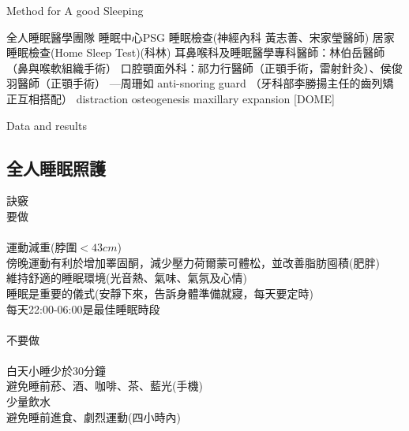 \documentclass[aspectratio=169]{beamer}
\begin{document}
\begin{frame}{Method for A good Sleeping}
\begin{block}{全人睡眠醫學團隊}
睡眠中心PSG 睡眠檢查(神經內科 黃志善、宋家瑩醫師)
居家睡眠檢查(Home Sleep Test)(科林)
耳鼻喉科及睡眠醫學專科醫師：林伯岳醫師（鼻與喉軟組織手術）
口腔顎面外科：祁力行醫師（正顎手術，雷射針灸）、侯俊羽醫師（正顎手術）
—周珊如 anti-snoring guard
（牙科部李勝揚主任的齒列矯正互相搭配）
distraction osteogenesis maxillary expansion [DOME]
~~\\
\end{block}
\end{frame}


\begin{frame}{Data and results}
\subsection{全人睡眠照護}
\begin{block}{訣竅}
~~\\
要做\\
~~\\
運動減重(脖圍$< 43 cm$)\\
傍晚運動有利於增加睪固酮，減少壓力荷爾蒙可體松，並改善脂肪囤積(肥胖)\\
維持舒適的睡眠環境(光音熱、氣味、氣氛及心情)\\
睡眠是重要的儀式(安靜下來，告訴身體準備就寢，每天要定時)\\
每天22:00-06:00是最佳睡眠時段\\


~~\\

不要做\\
~~\\
白天小睡少於30分鐘\\
避免睡前菸、酒、咖啡、茶、藍光(手機)\\
少量飲水\\
避免睡前進食、劇烈運動(四小時內)\\
~~\\
~~\\
\end{block}
\end{frame}
\end{document}
